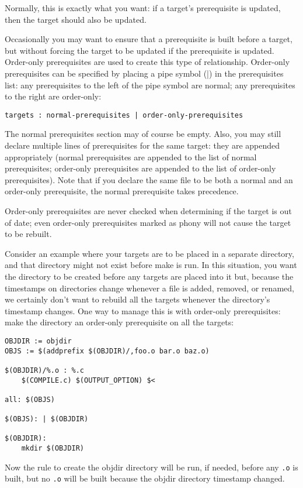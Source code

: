 Normally, this is exactly what you want: if a target’s prerequisite is updated, then the target should also be updated.

Occasionally you may want to ensure that a prerequisite is built before a target, but without forcing the target to be updated if the prerequisite is updated. Order-only prerequisites are used to create this type of relationship. Order-only prerequisites can be specified by placing a pipe symbol (|) in the prerequisites list: any prerequisites to the left of the pipe symbol are normal; any prerequisites to the right are order-only:

\begin{verbatim}
targets : normal-prerequisites | order-only-prerequisites
\end{verbatim}
The normal prerequisites section may of course be empty. Also, you may still declare multiple lines of prerequisites for the same target: they are appended appropriately (normal prerequisites are appended to the list of normal prerequisites; order-only prerequisites are appended to the list of order-only prerequisites). Note that if you declare the same file to be both a normal and an order-only prerequisite, the normal prerequisite takes precedence.

Order-only prerequisites are never checked when determining if the target is out of date; even order-only prerequisites marked as phony will not cause the target to be rebuilt.

Consider an example where your targets are to be placed in a separate directory, and that directory might not exist before make is run. In this situation, you want the directory to be created before any targets are placed into it but, because the timestamps on directories change whenever a file is added, removed, or renamed, we certainly don’t want to rebuild all the targets whenever the directory’s timestamp changes. One way to manage this is with order-only prerequisites: make the directory an order-only prerequisite on all the targets:

\begin{verbatim}
OBJDIR := objdir
OBJS := $(addprefix $(OBJDIR)/,foo.o bar.o baz.o)

$(OBJDIR)/%.o : %.c
    $(COMPILE.c) $(OUTPUT_OPTION) $<

all: $(OBJS)

$(OBJS): | $(OBJDIR)

$(OBJDIR):
    mkdir $(OBJDIR)
\end{verbatim}
Now the rule to create the objdir directory will be run, if needed, before any \texttt{.o} is built, but no \texttt{.o} will be built because the objdir directory timestamp changed.

